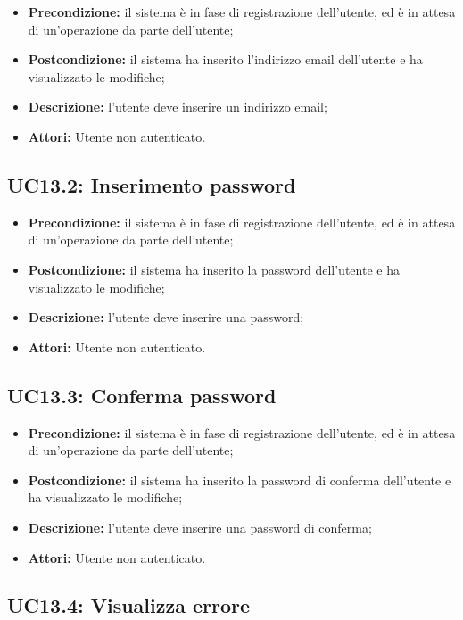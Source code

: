 \begin{itemize}
	\item \textbf{Precondizione:} il sistema è in fase di registrazione dell'utente, ed è in attesa di un'operazione da parte dell'utente;
	\item \textbf{Postcondizione:} il sistema ha inserito l'indirizzo email dell'utente e ha visualizzato le modifiche;
	\item \textbf{Descrizione:} l'utente deve inserire un indirizzo email;
	\item \textbf{Attori:} Utente non autenticato.
\end{itemize}
\subsection{ UC13.2: Inserimento password}

\begin{itemize}
	\item \textbf{Precondizione:} il sistema è in fase di registrazione dell'utente, ed è in attesa di un'operazione da parte dell'utente;
	\item \textbf{Postcondizione:} il sistema ha inserito la password dell'utente e ha visualizzato le modifiche;
	\item \textbf{Descrizione:} l'utente deve inserire una password;
	\item \textbf{Attori:} Utente non autenticato.
\end{itemize}
\subsection{ UC13.3: Conferma password}

\begin{itemize}
	\item \textbf{Precondizione:} il sistema è in fase di registrazione dell'utente, ed è in attesa di un'operazione da parte dell'utente;
	\item \textbf{Postcondizione:} il sistema ha inserito la password di conferma dell'utente e ha visualizzato le modifiche;
	\item \textbf{Descrizione:} l'utente deve inserire una password di conferma;
	\item \textbf{Attori:} Utente non autenticato.
\end{itemize}
\subsection{ UC13.4: Visualizza errore}

